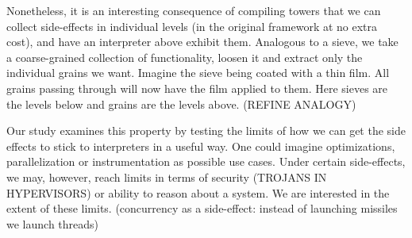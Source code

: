 \documentclass{article}
\begin{document}
Nonetheless, it is an interesting consequence of compiling towers that we can collect side-effects in individual levels (in the original framework at no extra cost), and have an interpreter
above exhibit them. Analogous to a sieve, we take a coarse-grained collection of functionality, loosen it and extract only the individual grains we want. Imagine the sieve being coated with a thin film. All grains passing through
will now have the film applied to them. Here sieves are the levels below and grains are the levels above. (REFINE ANALOGY)

Our study examines this property by testing the limits of how we can get the side effects to stick to interpreters in a useful way. One could imagine optimizations, parallelization or instrumentation as possible use cases. Under certain side-effects, we may, however,
reach limits in terms of security (TROJANS IN HYPERVISORS) or ability to reason about a system. We are interested in the extent of these limits. (concurrency as a side-effect: instead of launching missiles we launch threads)



\end{document}

